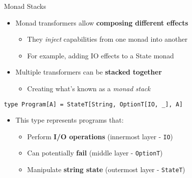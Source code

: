 \documentclass[presentation, 10pt]{beamer}\mode<presentation>{\usetheme{metropolis}}
\begin{document}
\begin{frame}[fragile]{Monad Stacks}
\begin{itemize}
	\item Monad transformers allow \textbf{composing different effects}
	\begin{itemize}
		\item They \emph{inject} capabilities from one monad into another
		\item For example, adding IO effects to a State monad
	\end{itemize}
	\item Multiple transformers can be \textbf{stacked together}
	\begin{itemize}
		\item Creating what's known as a \emph{monad stack}
	\end{itemize}
\end{itemize}
\begin{tcolorbox}
\begin{verbatim}
type Program[A] = StateT[String, OptionT[IO, _], A]
\end{verbatim}
\end{tcolorbox}

\begin{itemize}
	\item This type represents programs that:
	\begin{itemize}
		\item Perform \textbf{I/O operations} (innermost layer - \texttt{IO})
		\item Can potentially \textbf{fail} (middle layer - \texttt{OptionT})
		\item Manipulate \textbf{string state} (outermost layer - \texttt{StateT})
	\end{itemize}
\end{itemize}
\end{frame}
\end{document}
